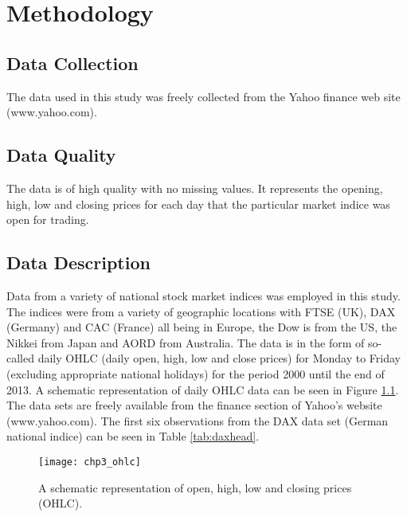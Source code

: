 
\chapter{Methodology} %

\label{Chapter3} %


\section{Data Collection}
The data used in this study was freely collected from the Yahoo finance web site (www.yahoo.com).

\section{Data Quality}
The data is of high quality with no missing values. It represents the opening, high, low and closing prices for each day that the particular market indice was open for trading. 

\section{Data Description}
Data from a variety of national stock market indices was employed in this study. The indices were from a variety of geographic locations with FTSE (UK), DAX (Germany) and CAC (France) all being in Europe, the Dow is from the US, the Nikkei from Japan and AORD from Australia. The data is in the form of so-called daily OHLC (daily open, high, low and close prices) for Monday to Friday (excluding appropriate national holidays) for the period 2000 until the end of 2013. A schematic representation of daily OHLC data can be seen in Figure \ref{fig:chp3_ohlc}. The data sets are freely available from the finance section of Yahoo's website (www.yahoo.com). The first six observations from the DAX data set (German national indice) can be seen in Table \ref{tab:daxhead}.

\begin{figure}[tbh]
\centering
\texttt{[image: chp3\_ohlc]}
\caption[Open, high, low and closing prices (OHLC).]{A schematic representation of open, high, low and closing prices (OHLC).}
\label{fig:chp3_ohlc}
\end{figure}

